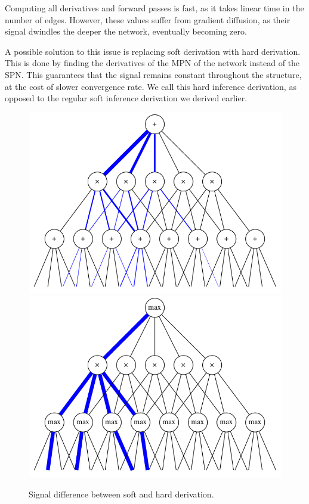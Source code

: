 Computing all derivatives and forward passes is fast, as it takes linear time in the number of
edges. However, these values suffer from gradient diffusion, as their signal dwindles the deeper
the network, eventually becoming zero.

A possible solution to this issue is replacing soft derivation with hard derivation. This is done
by finding the derivatives of the MPN of the network instead of the SPN\@. This guarantees that the
signal remains constant throughout the structure, at the cost of slower convergence rate. We call
this hard inference derivation, as opposed to the regular soft inference derivation we derived
earlier.

\begin{figure}[h]
  \centering\includegraphics[scale=0.325]{graphs/softgrad.png}
  \includegraphics[scale=0.325]{graphs/hardgrad.png}
  \caption{Signal difference between soft and hard derivation.\label{fig:soft_hard_diff}}
\end{figure}

